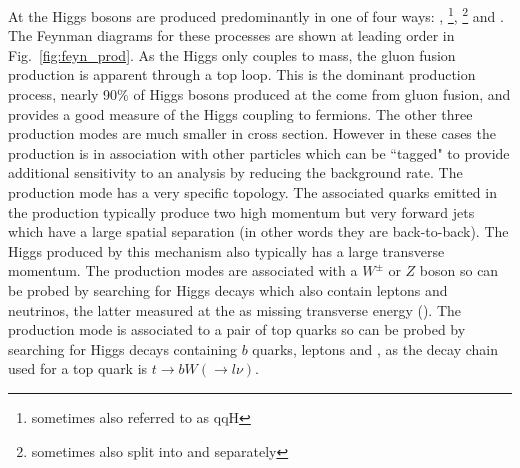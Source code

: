 At the \LHC \SM Higgs bosons are produced predominantly in one of four ways: \ggH, \VBF\footnote{sometimes also referred to as qqH}, \VH\footnote{sometimes also split into \WH and \ZH separately} and \ttH. The Feynman diagrams for these processes are shown at leading order in Fig.~\ref{fig:feyn_prod}. As the Higgs only couples to mass, the gluon fusion production is apparent through a top loop. This is the dominant production process, nearly 90\% of Higgs bosons produced at the \LHC come from gluon fusion, and provides a good measure of the Higgs coupling to fermions. The other three production modes are much smaller in cross section. However in these cases the production is in association with other particles which can be ``tagged" to provide additional sensitivity to an analysis by reducing the background rate. The \VBF production mode has a very specific topology. The associated quarks emitted in the production typically produce two high momentum but very forward jets which have a large spatial separation (in other words they are back-to-back). The Higgs produced by this mechanism also typically has a large transverse momentum. The \VH production modes are associated with a $W^{\pm}$ or $Z$ boson so can be probed by searching for Higgs decays which also contain leptons and neutrinos, the latter measured at the \LHC as missing transverse energy (\MET). The \ttH production mode is associated to a pair of top quarks so can be probed by searching for Higgs decays containing $b$ quarks, leptons and \MET, as the decay chain used for a top quark is $t\rightarrow bW(\rightarrow l\nu)$.

